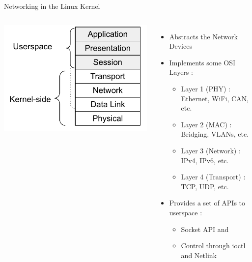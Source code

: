 \begin{frame}{Networking in the Linux Kernel}
	\begin{columns}
	\includegraphics[width=\textwidth]{slides/networking-stack-overview/osi-kernel.pdf}
	\begin{itemize}
		\item Abstracts the Network Devices
		\item Implements some OSI Layers :
			\begin{itemize}
				\item Layer 1 (PHY) : Ethernet, WiFi, CAN, etc.
				\item Layer 2 (MAC) : Bridging, VLANs, etc.
				\item Layer 3 (Network) : IPv4, IPv6, etc.
				\item Layer 4 (Transport) : TCP, UDP, etc.
			\end{itemize}
		\item Provides a set of APIs to userspace :
			\begin{itemize}
				\item Socket API and 
				\item Control through ioctl and Netlink
			\end{itemize}
	\end{itemize}
	\end{columns}
\end{frame}

